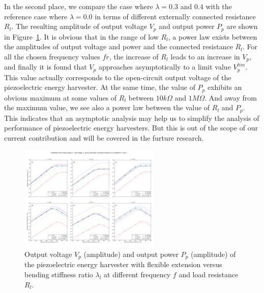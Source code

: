 \documentclass{elsarticle}
\begin{document}
In the second place, we compare the case where $\lambda = 0.3$ and $0.4$ with the reference case where $\lambda = 0.0$ in terms of different externally connected resistance $R_l$. The resulting amplitude of output voltage $V_p$ and output power $P_p$ are shown in Figure~\ref{fig:fig_perf_laml_0p3_0p4_vs_fr_Rl}. It is obvious that in the range of low $R_l$, a power law exists between the amplitudes of output voltage and power and the connected resistance $R_l$. For all the chosen frequency values $fr$, the increase of $R_l$ leads to an increase in $V_p$, and finally it is found that $V_p$ approaches asymptotically to a limit value $V_p^{lim}$. This value actually corresponds to the open-circuit output voltage of the piezoelectric energy harvester. At the same time, the value of $P_p$ exhibits an obvious maximum at some values of $R_l$ between $10 k\Omega$ and $1 M\Omega$. And away from the maximum value, we see also a power law between the value of $R_l$ and $P_p$. This indicates that an asymptotic analysis may help us to simplify the analysis of performance of piezoelectric energy harvesters. But this is out of the scope of our current contribution and will be covered in the furture research.

\begin{figure}[!htbp]
    \centering
    \includegraphics[width=0.6\textwidth]{./fig_perf_laml_0p3_0p4_vs_fr_Rl}
    \caption{Output voltage $V_p$ (amplitude) and output power $P_p$ (amplitude) of the piezoelectric energy harvester with flexible extension versus bending stiffness ratio $\lambda_l$ at different frequency $f$ and load resistance $R_l$. }
    \label{fig:fig_perf_laml_0p3_0p4_vs_fr_Rl}
\end{figure}
\end{document}
